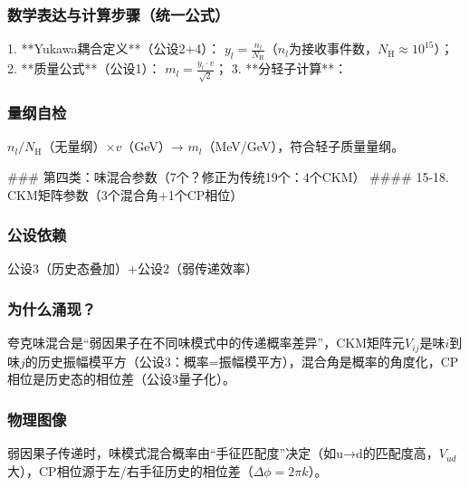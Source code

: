 \documentclass{article}
\begin{document}
\subsubsection{数学表达与计算步骤（统一公式）}
1. **Yukawa耦合定义**（公设2+4）：  
   \(y_l = \frac{n_l}{N_{\text{H}}}\)（\(n_l\)为接收事件数，\(N_{\text{H}}≈10^{15}\)）；  
2. **质量公式**（公设1）：  
   \(m_l = \frac{y_l·v}{\sqrt{2}}\)；  
3. **分轻子计算**：

\begin{table}[h!]
\centering
{}
\end{table}

\subsubsection{量纲自检}
\(n_l/N_{\text{H}}\)（无量纲）×\(v\)（GeV）→ \(m_l\)（MeV/GeV），符合轻子质量量纲。


### 第四类：味混合参数（7个？修正为传统19个：4个CKM）
#### 15-18. CKM矩阵参数（3个混合角+1个CP相位）
\subsubsection{公设依赖}
公设3（历史态叠加）+公设2（弱传递效率）

\subsubsection{为什么涌现？}
夸克味混合是“弱因果子在不同味模式中的传递概率差异”，CKM矩阵元\(V_{ij}\)是味\(i\)到味\(j\)的历史振幅模平方（公设3：概率=振幅模平方），混合角是概率的角度化，CP相位是历史态的相位差（公设3量子化）。

\subsubsection{物理图像}
弱因果子传递时，味模式混合概率由“手征匹配度”决定（如u→d的匹配度高，\(V_{ud}\)大），CP相位源于左/右手征历史的相位差（\(\Delta\phi=2\pi k\)）。
\end{document}
